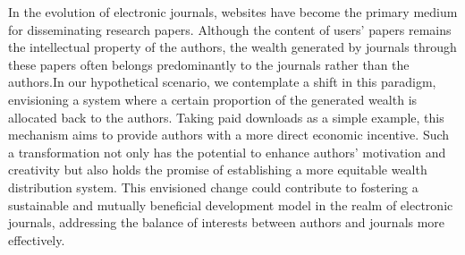 \documentclass[lettersize,journal]{IEEEtran}
\begin{document}
In the evolution of electronic journals, websites have become the primary medium for disseminating research papers. Although the content of users' papers remains the intellectual property of the authors, the wealth generated by journals through these papers often belongs predominantly to the journals rather than the authors.In our hypothetical scenario, we contemplate a shift in this paradigm, envisioning a system where a certain proportion of the generated wealth is allocated back to the authors. Taking paid downloads as a simple example, this mechanism aims to provide authors with a more direct economic incentive. Such a transformation not only has the potential to enhance authors' motivation and creativity but also holds the promise of establishing a more equitable wealth distribution system. This envisioned change could contribute to fostering a sustainable and mutually beneficial development model in the realm of electronic journals, addressing the balance of interests between authors and journals more effectively.
\end{document}
